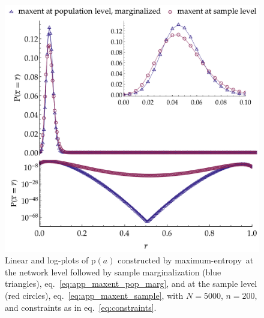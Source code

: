 \documentclass[\ifafour a4paper,12pt,\else a5paper,10pt,\fi%
onecolumn,oneside,article,%
british%
]{memoir}
\theoremstyle{remark}
\theoremstyle{innote}
\newcommand*{\pf}{\mathrm{p}}%
\renewcommand*{\|}{\nonscript\,\vert\nonscript\;\mathopen{}}
\newcommand*{\eqn}{eq.}%
\newcommand*{\yav}{a}
\newcommand*{\yNv}{N}
\newcommand*{\ya}{\yav}%
\newcommand*{\me}{maximum-entropy}
\begin{document}
\iffalse
\begin{figure}[!t]
\centering
\includegraphics[width=\linewidth]{different_maxent_pop_sample_200_realdata_2mom.pdf}%
\caption{Linear and log-plots of $\pf(\ya)$ constructed by \me\ at
  the network level followed by sample marginalization (blue triangles),
  \eqn~\eqref{eq:app_maxent_pop_marg}, and at the sample level (red
  circles), \eqn~\eqref{eq:app_maxent_sample}, with $\yNv=5000$,
  $n=200$, and constraints as in \eqn~\eqref{eq:constraints}.}
\label{fig:diff_maxent_pop_sample}
\end{figure}%
%
\end{document}
